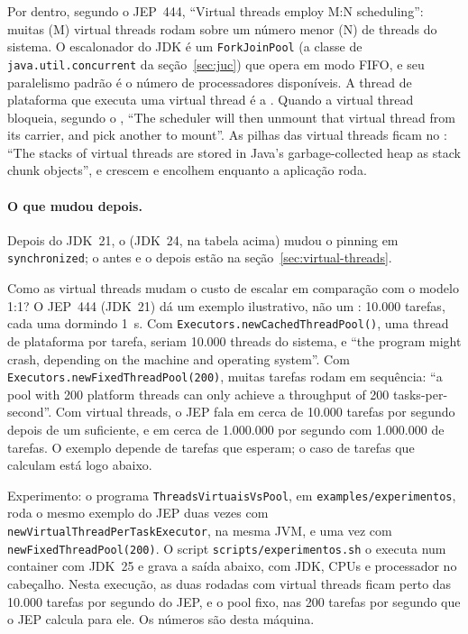 Por dentro, segundo o JEP~444, \enquote{Virtual threads employ M:N
scheduling}: muitas (M) virtual threads rodam sobre um número menor (N)
de threads do sistema. O escalonador do JDK é um \texttt{ForkJoinPool}
(a classe de \texttt{java.util.concurrent} da seção~\ref{sec:juc}) que
opera em modo FIFO, e seu paralelismo padrão é o número de
processadores disponíveis. A thread de plataforma que executa uma
virtual thread é a .
Quando a virtual thread bloqueia, segundo o ,
\enquote{The scheduler will then unmount that virtual thread from its
carrier, and pick another to mount}. As pilhas das virtual threads
ficam no : \enquote{The stacks of virtual threads are stored in
Java's garbage-collected heap as stack chunk objects}, e crescem e
encolhem enquanto a aplicação roda.

\paragraph{O que mudou depois.}
Depois do JDK~21, o  (JDK~24, na tabela acima)
mudou o pinning em \texttt{synchronized}; o antes e o depois estão na
seção~\ref{sec:virtual-threads}.

Como as virtual threads mudam o custo de escalar em comparação com o
modelo 1:1? O JEP~444 (JDK~21) dá um exemplo ilustrativo, não um
: 10.000 tarefas, cada uma dormindo 1~s. Com
\texttt{Executors.newCachedThreadPool()}, uma thread de plataforma por
tarefa, seriam 10.000 threads do sistema, e \enquote{the program might
crash, depending on the machine and operating system}. Com
\texttt{Executors.newFixedThreadPool(200)}, muitas tarefas rodam em
sequência: \enquote{a pool with 200 platform threads can only achieve a
throughput of 200 tasks-per-second}. Com virtual threads, o JEP fala em
cerca de 10.000 tarefas por segundo depois de um
 suficiente, e em
cerca de 1.000.000 por segundo com 1.000.000 de tarefas. O exemplo
depende de tarefas que esperam; o caso de tarefas que calculam está
logo abaixo.

Experimento: o programa \texttt{ThreadsVirtuaisVsPool}, em
\texttt{examples/experimentos}, roda o mesmo exemplo do JEP duas vezes
com \texttt{newVirtualThreadPerTaskExecutor}, na mesma JVM, e uma vez com
\texttt{newFixedThreadPool(200)}. O script
\texttt{scripts/experimentos.sh} o executa num container com JDK~25 e
grava a saída abaixo, com JDK, CPUs e processador no cabeçalho. Nesta
execução, as duas rodadas com virtual threads ficam perto das 10.000
tarefas por segundo do JEP, e o pool fixo, nas 200 tarefas por segundo
que o JEP calcula para ele. Os números são desta máquina.

